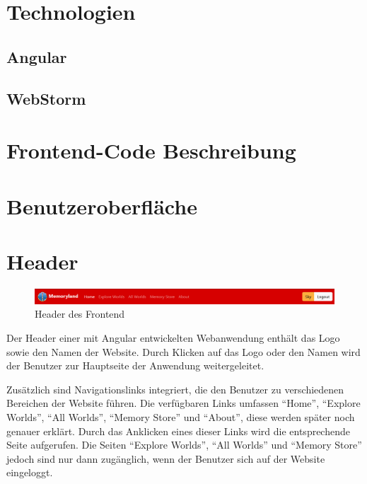 
\section{Technologien}

\subsection{Angular}

\subsection{WebStorm}

\section{Frontend-Code Beschreibung}



\section{Benutzeroberfläche}

\section{Header}

\begin{figure} [h t]
    \centering
    \includegraphics[scale=0.5]{pics/header_login.PNG}
    \caption{Header des Frontend}
    \label{fig:header-frontend}
\end{figure}

Der Header einer mit Angular entwickelten Webanwendung enthält das Logo sowie 
den Namen der Website. Durch Klicken auf das Logo oder den Namen wird der 
Benutzer zur Hauptseite der Anwendung weitergeleitet.

Zusätzlich sind Navigationslinks integriert, die den Benutzer zu verschiedenen 
Bereichen der Website führen. Die verfügbaren Links umfassen ``Home'', ``Explore 
Worlds'', ``All Worlds'', ``Memory Store'' und ``About'', diese werden später noch 
genauer erklärt. Durch das Anklicken eines dieser Links wird die entsprechende 
Seite aufgerufen. Die Seiten ``Explore Worlds'', ``All Worlds'' und ``Memory Store'' 
jedoch sind nur dann zugänglich, wenn der Benutzer sich auf der Website 
eingeloggt.


